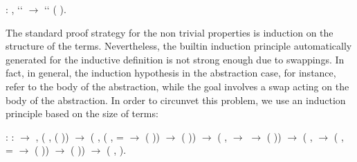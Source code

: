 \begin{coqdoccode}
\coqdocemptyline
\coqdocnoindent
{}  : \coqdockw{\ensuremath{\forall}}   ,  ``   \ensuremath{\rightarrow}  ``  (   ).\coqdoceol
\coqdocemptyline
\coqdocemptyline
\end{coqdoccode}
The standard proof strategy for the non trivial properties is induction on the structure of the terms. Nevertheless, the builtin induction principle automatically generated for the inductive definition  is not strong enough due to swappings. In fact, in general, the induction hypothesis in the abstraction case, for instance, refer to the body of the abstraction, while the goal involves a swap acting on the body of the abstraction. In order to circunvet this problem, we use an induction principle based on the size of terms: 
\begin{coqdoccode}
\coqdocemptyline
\coqdocnoindent
{} : \coqdockw{\ensuremath{\forall}}  :  \ensuremath{\rightarrow} , (\coqdockw{\ensuremath{\forall}} ,  ( )) \ensuremath{\rightarrow}\coqdoceol
\coqdocindent{0.50em}
(\coqdockw{\ensuremath{\forall}}  , (\coqdockw{\ensuremath{\forall}}   ,   =   \ensuremath{\rightarrow}  (   )) \ensuremath{\rightarrow}  (  )) \ensuremath{\rightarrow}\coqdoceol
\coqdocindent{0.50em}
(\coqdockw{\ensuremath{\forall}}  ,   \ensuremath{\rightarrow}   \ensuremath{\rightarrow}  (  )) \ensuremath{\rightarrow}\coqdoceol
\coqdocindent{0.50em}
(\coqdockw{\ensuremath{\forall}}   ,   \ensuremath{\rightarrow} (\coqdockw{\ensuremath{\forall}}   ,   =   \ensuremath{\rightarrow}  (   )) \ensuremath{\rightarrow}  (   )) \ensuremath{\rightarrow} (\coqdockw{\ensuremath{\forall}} ,  ).\coqdoceol
\coqdocemptyline
\end{coqdoccode}
